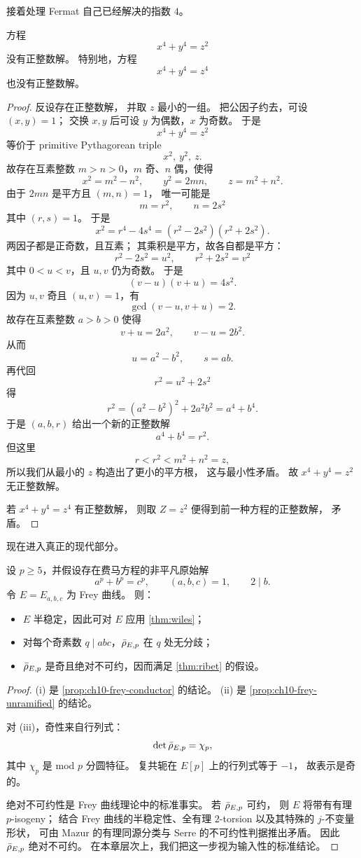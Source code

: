 接着处理 Fermat 自己已经解决的指数 $4$。

\begin{theorem}[Fermat 的 $n=4$ 情形]
\label{thm:ch10-n4}
方程
\[
  x^4+y^4=z^2
\]
没有正整数解。
特别地，方程
\[
  x^4+y^4=z^4
\]
也没有正整数解。
\end{theorem}

\begin{proof}
反设存在正整数解，
并取 $z$ 最小的一组。
把公因子约去，可设 $(x,y)=1$；
交换 $x,y$ 后可设 $y$ 为偶数，$x$ 为奇数。
于是
\[
  x^4+y^4=z^2
\]
等价于 primitive Pythagorean triple
\[
  x^2,\ y^2,\ z.
\]
故存在互素整数 $m>n>0$，$m$ 奇、$n$ 偶，使得
\[
  x^2=m^2-n^2,
  \qquad
  y^2=2mn,
  \qquad
  z=m^2+n^2.
\]
由于 $2mn$ 是平方且 $(m,n)=1$，
唯一可能是
\[
  m=r^2,
  \qquad
  n=2s^2
\]
其中 $(r,s)=1$。
于是
\[
  x^2=r^4-4s^4=(r^2-2s^2)(r^2+2s^2).
\]
两因子都是正奇数，且互素；
其乘积是平方，故各自都是平方：
\[
  r^2-2s^2=u^2,
  \qquad
  r^2+2s^2=v^2
\]
其中 $0<u<v$，且 $u,v$ 仍为奇数。
于是
\[
  (v-u)(v+u)=4s^2.
\]
因为 $u,v$ 奇且 $(u,v)=1$，有
\[
  \gcd(v-u,v+u)=2.
\]
故存在互素整数 $a>b>0$ 使得
\[
  v+u=2a^2,
  \qquad
  v-u=2b^2.
\]
从而
\[
  u=a^2-b^2,
  \qquad
  s=ab.
\]
再代回
\[
  r^2=u^2+2s^2
\]
得
\[
  r^2=(a^2-b^2)^2+2a^2b^2=a^4+b^4.
\]
于是 $(a,b,r)$ 给出一个新的正整数解
\[
  a^4+b^4=r^2.
\]
但这里
\[
  r<r^2<m^2+n^2=z,
\]
所以我们从最小的 $z$ 构造出了更小的平方根，
这与最小性矛盾。
故 $x^4+y^4=z^2$ 无正整数解。

若 $x^4+y^4=z^4$ 有正整数解，
则取 $Z=z^2$ 便得到前一种方程的正整数解，
矛盾。
\end{proof}

现在进入真正的现代部分。

\begin{proposition}
\label{prop:ch10-frey-hypotheses}
设 $p\ge 5$，并假设存在费马方程的非平凡原始解
\[
  a^p+b^p=c^p,
  \qquad (a,b,c)=1,
  \qquad 2\mid b.
\]
令 $E=E_{a,b,c}$ 为 Frey 曲线。
则：
\begin{itemize}
  \item[(i)] $E$ 半稳定，因此可对 $E$ 应用 \cref{thm:wiles}；
  \item[(ii)] 对每个奇素数 $q\mid abc$，$\bar{\rho}_{E,p}$ 在 $q$ 处无分歧；
  \item[(iii)] $\bar{\rho}_{E,p}$ 是奇且绝对不可约，因而满足 \cref{thm:ribet} 的假设。
\end{itemize}
\end{proposition}

\begin{proof}
(i) 是 \cref{prop:ch10-frey-conductor} 的结论。
(ii) 是 \cref{prop:ch10-frey-unramified} 的结论。

对 (iii)，奇性来自行列式：
\[
  \det \bar{\rho}_{E,p}=\chi_p,
\]
其中 $\chi_p$ 是 mod $p$ 分圆特征。
复共轭在 $E[p]$ 上的行列式等于 $-1$，
故表示是奇的。

绝对不可约性是 Frey 曲线理论中的标准事实。
若 $\bar{\rho}_{E,p}$ 可约，
则 $E$ 将带有有理 $p$-isogeny；
结合 Frey 曲线的半稳定性、全有理 $2$-torsion 以及其特殊的 $j$-不变量形状，
可由 Mazur 的有理同源分类与 Serre 的不可约性判据推出矛盾。
因此 $\bar{\rho}_{E,p}$ 绝对不可约。
在本章层次上，我们把这一步视为输入性的标准结论。
\end{proof}

